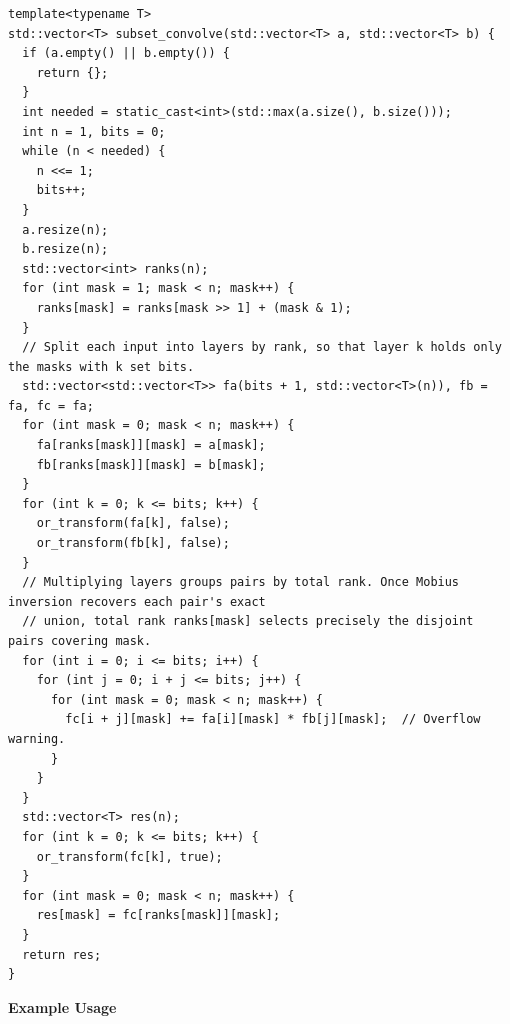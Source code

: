 \begin{lstlisting}[style=cpp]
template<typename T>
std::vector<T> subset_convolve(std::vector<T> a, std::vector<T> b) {
  if (a.empty() || b.empty()) {
    return {};
  }
  int needed = static_cast<int>(std::max(a.size(), b.size()));
  int n = 1, bits = 0;
  while (n < needed) {
    n <<= 1;
    bits++;
  }
  a.resize(n);
  b.resize(n);
  std::vector<int> ranks(n);
  for (int mask = 1; mask < n; mask++) {
    ranks[mask] = ranks[mask >> 1] + (mask & 1);
  }
  // Split each input into layers by rank, so that layer k holds only the masks with k set bits.
  std::vector<std::vector<T>> fa(bits + 1, std::vector<T>(n)), fb = fa, fc = fa;
  for (int mask = 0; mask < n; mask++) {
    fa[ranks[mask]][mask] = a[mask];
    fb[ranks[mask]][mask] = b[mask];
  }
  for (int k = 0; k <= bits; k++) {
    or_transform(fa[k], false);
    or_transform(fb[k], false);
  }
  // Multiplying layers groups pairs by total rank. Once Mobius inversion recovers each pair's exact
  // union, total rank ranks[mask] selects precisely the disjoint pairs covering mask.
  for (int i = 0; i <= bits; i++) {
    for (int j = 0; i + j <= bits; j++) {
      for (int mask = 0; mask < n; mask++) {
        fc[i + j][mask] += fa[i][mask] * fb[j][mask];  // Overflow warning.
      }
    }
  }
  std::vector<T> res(n);
  for (int k = 0; k <= bits; k++) {
    or_transform(fc[k], true);
  }
  for (int mask = 0; mask < n; mask++) {
    res[mask] = fc[ranks[mask]][mask];
  }
  return res;
}
\end{lstlisting}
\textbf{Example Usage}\par
